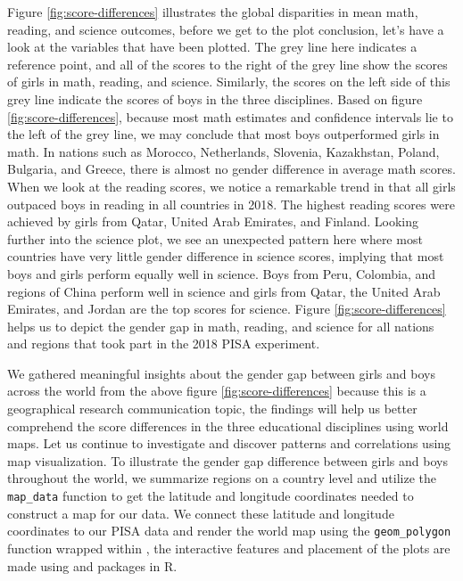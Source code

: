 Figure \ref{fig:score-differences} illustrates the global disparities in
mean math, reading, and science outcomes, before we get to the plot
conclusion, let's have a look at the variables that have been plotted.
The grey line here indicates a reference point, and all of the scores to
the right of the grey line show the scores of girls in math, reading,
and science. Similarly, the scores on the left side of this grey line
indicate the scores of boys in the three disciplines. Based on figure
\ref{fig:score-differences}, because most math estimates and confidence
intervals lie to the left of the grey line, we may conclude that most
boys outperformed girls in math. In nations such as Morocco,
Netherlands, Slovenia, Kazakhstan, Poland, Bulgaria, and Greece, there
is almost no gender difference in average math scores. When we look at
the reading scores, we notice a remarkable trend in that all girls
outpaced boys in reading in all countries in 2018. The highest reading
scores were achieved by girls from Qatar, United Arab Emirates, and
Finland. Looking further into the science plot, we see an unexpected
pattern here where most countries have very little gender difference in
science scores, implying that most boys and girls perform equally well
in science. Boys from Peru, Colombia, and regions of China perform well
in science and girls from Qatar, the United Arab Emirates, and Jordan
are the top scores for science. Figure \ref{fig:score-differences} helps
us to depict the gender gap in math, reading, and science for all
nations and regions that took part in the 2018 PISA experiment.

We gathered meaningful insights about the gender gap between girls and
boys across the world from the above figure \ref{fig:score-differences}
because this is a geographical research communication topic, the
findings will help us better comprehend the score differences in the
three educational disciplines using world maps. Let us continue to
investigate and discover patterns and correlations using map
visualization. To illustrate the gender gap difference between girls and
boys throughout the world, we summarize regions on a country level and
utilize the \texttt{map\_data} function to get the latitude and
longitude coordinates needed to construct a map for our data. We connect
these latitude and longitude coordinates to our PISA data and render the
world map using the \texttt{geom\_polygon} function wrapped within
 \citep{ggplot2}, the interactive features and
placement of the plots are made using  \citep{plotly}
and  \citep{patchwork} packages in R.


